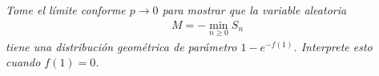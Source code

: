 \emph{
	Tome el límite conforme \(p\to 0\) para mostrar que la variable aleatoria 
	\begin{align}
		M=-\min_{n\geq 0}S_n
	\end{align}
	tiene una distribuci\'on geom\'etrica de par\'ametro $1-e^{-f(1)}$. Interprete esto cuando $f(1)=0$.
}